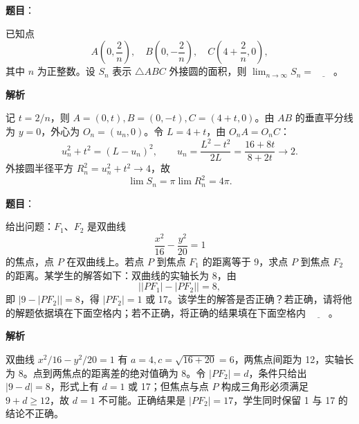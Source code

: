 \begin{answer}

\textbf{题目}：

已知点
\nopagebreak[4]
\[
    A\left(0,\frac{2}{n}\right),\quad B\left(0,-\frac{2}{n}\right),\quad C\left(4+\frac{2}{n},0\right),
\]
    其中 \(n\) 为正整数。设 \(S_n\) 表示 \(\triangle ABC\) 外接圆的面积，则 \(\lim_{n\to\infty}S_n=\underline{\qquad}\)。

\textbf{解析}

记 \(t=2/n\)，则 \(A=(0,t),B=(0,-t),C=(4+t,0)\)。由 \(AB\) 的垂直平分线为 \(y=0\)，外心为 \(O_n=(u_n,0)\)。令 \(L=4+t\)，由 \(O_nA=O_nC\)：
\nopagebreak[4]
\[
u_n^2+t^2=(L-u_n)^2,\qquad
u_n=\frac{L^2-t^2}{2L}=\frac{16+8t}{8+2t}\longrightarrow2.
\]
外接圆半径平方 \(R_n^2=u_n^2+t^2\to4\)，故
\nopagebreak[4]
\[
\lim S_n=\pi\lim R_n^2=4\pi.
\]


\end{answer}
\begin{answer}

\textbf{题目}：

给出问题：\(F_1\text{、}F_2\) 是双曲线
\nopagebreak[4]
\[
    \frac{x^2}{16}-\frac{y^2}{20}=1
\]
    的焦点，点 \(P\) 在双曲线上。若点 \(P\) 到焦点 \(F_1\) 的距离等于 9，求点 \(P\) 到焦点 \(F_2\) 的距离。某学生的解答如下：双曲线的实轴长为 8，由
\nopagebreak[4]
\[
    \bigl||PF_1|-|PF_2|\bigr|=8,
\]
    即 \(|9-|PF_2||=8\)，得 \(|PF_2|=1\) 或 17。该学生的解答是否正确？若正确，请将他的解题依据填在下面空格内；若不正确，将正确的结果填在下面空格内 \(\underline{\qquad}\)。

\textbf{解析}

双曲线 \(x^2/16-y^2/20=1\) 有 \(a=4,c=\sqrt{16+20}=6\)，两焦点间距为 12，实轴长为 8。点到两焦点的距离差的绝对值确为 8。令 \(|PF_2|=d\)，条件只给出 \(|9-d|=8\)，形式上有 \(d=1\) 或 17；但焦点与点 \(P\) 构成三角形必须满足 \(9+d\ge12\)，故 \(d=1\) 不可能。正确结果是 \(|PF_2|=17\)，学生同时保留 1 与 17 的结论不正确。


\end{answer}

